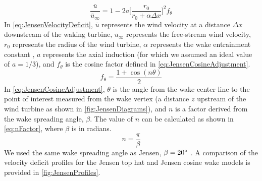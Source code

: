 \documentclass{jpconf}
\begin{document}
\begin{equation}
\frac{ \bar{u}}{\bar{u}_\infty} = 1 - 2a \bigg[\frac{r_0}{r_0 + \alpha \Delta x} \bigg]^2 f_\theta 
\label{eq:JensenVelocityDeficit}
\end{equation}
%
In \cref{eq:JensenVelocityDeficit}, $\bar{u}$ represents the wind velocity at a distance $\Delta x$ downstream of the waking turbine, $\bar{u}_\infty$ represents the free-stream wind velocity, $r_0$ represents the radius of the wind turbine, $\alpha$ represents the wake entrainment constant \cite{jensen1983}, $a$ represents the axial induction (for which we assumed an ideal value of $a = 1/3$), and $f_\theta$ is the cosine factor defined in \cref{eq:JensenCosineAdjustment}.
%
\begin{equation}
f_\theta = \frac{1 + \cos{(n\theta)}}{2}
\label{eq:JensenCosineAdjustment}
\end{equation}
%
In \cref{eq:JensenCosineAdjustment},  $\theta$ is the angle from the wake center line to the point of interest measured from the wake vertex (a distance $z$ upstream of the wind turbine as shown in \cref{fig:JensenDiagrams}), and $n$ is a factor derived from the wake spreading angle, $\beta$. The value of $n$ can be calculated as shown in \cref{eq:nFactor}, where $\beta$ is in radians. 
%
\begin{equation}
n = \frac{\pi}{\beta}
\label{eq:nFactor}
\end{equation}
%
We used the same wake spreading angle as Jensen, $\beta = 20 \degree$  \cite{jensen1983}. A comparison of the velocity deficit profiles for the Jensen top hat and Jensen cosine wake models is provided in \cref{fig:JensenProfiles}.
%
\end{document}
